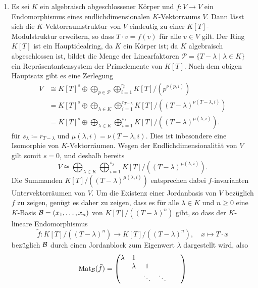 \begin{solution}
\begin{enumerate}
    \item
      Es sei $K$ ein algebraisch abgeschlossener Körper und $f \colon V \to V$ ein Endomorphismus eines endlichdimensionalen $K$-Vektorraums $V$.
      Dann lässt sich die $K$-Vektorraumstruktur von $V$ eindeutig zu einer $K[T]$-Modulstruktur erweitern, so dass $T \cdot v = f(v)$ für alle $v \in V$ gilt.
      Der Ring $K[T]$ ist ein Hauptidealring, da $K$ ein Körper ist;
      da $K$ algebraisch abgeschlossen ist, bildet die Menge der Linearfaktoren $\mathcal{P} = \{T - \lambda \mid \lambda \in K\}$ ein Repräsentantensystem der Primelemente von $K[T]$.
      Nach dem obigen Hauptsatz gibt es eine Zerlegung
      \begin{align*}
        V
        &\cong K[T]^s \oplus \bigoplus_{p \in \mathcal{P}} \bigoplus_{i=1}^{r_p} K[T]/(p^{\nu(p,i)})
        \\
        &=     K[T]^s \oplus \bigoplus_{\lambda \in K} \bigoplus_{i=1}^{r_{T-\lambda}} K[T]/( (T - \lambda)^{\nu(T-\lambda,i)} )
        \\
        &=     K[T]^s \oplus \bigoplus_{\lambda \in K} \bigoplus_{i=1}^{s_\lambda} K[T]/( (T-\lambda)^{\mu(\lambda, i)} ).
      \end{align*}
      für $s_\lambda \coloneqq r_{T-\lambda}$ und $\mu(\lambda,i) = \nu(T-\lambda,i)$.
      Dies ist inbesondere eine Isomorphie von $K$-Vektorräumen.
      Wegen der Endlichdimensionalität von $V$ gilt somit $s = 0$, und deshalb bereits
      \[
        V \cong \bigoplus_{\lambda \in K} \bigoplus_{i=1}^{s_\lambda} K[T]/( (T-\lambda)^{\mu(\lambda, i)} ).
      \]
      Die Summanden $K[T]/( (T-\lambda)^{\mu(\lambda, i)} )$ entsprechen dabei $f$-invarianten Untervektorräumen von $V$.
      Um die Existenz einer Jordanbasis von $V$ bezüglich $f$ zu zeigen, genügt es daher zu zeigen, dass es für alle $\lambda \in K$ und $n \geq 0$ eine $K$-Basis $\mathcal{B} = (x_1, \dotsc, x_n)$ von $K[T]/( (T-\lambda)^n )$ gibt, so dass der $K$-lineare Endomorphismus
      \[
        \tilde{f} \colon K[T]/((T-\lambda)^n) \to K[T]/((T-\lambda)^n),
        \quad
        x \mapsto T \cdot x
      \]
      bezüglich $\mathcal{B}$ durch einen Jordanblock zum Eigenwert $\lambda$ dargestellt wird, also
      \[
        \operatorname{Mat}_{\mathcal{B}}(\tilde{f})
        =
        \begin{pmatrix}
          \lambda & 1       &         &         &         &         \\
                  & \lambda & 1       &         &         &         \\
                  &         & \ddots  & \ddots  &         &         \\

\end{pmatrix}\]
\end{enumerate}
\end{solution}
